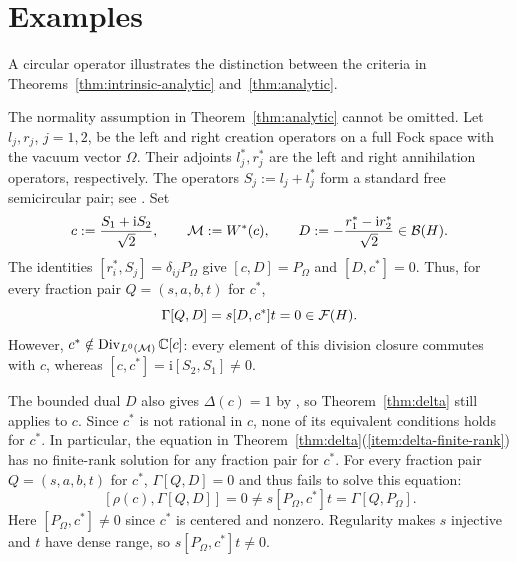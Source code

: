 \section{Examples}
\label{sec:examples}

A circular operator illustrates the distinction between the criteria in Theorems~\ref{thm:intrinsic-analytic} and~\ref{thm:analytic}.

\begin{remark}\label{rem:normality}
The normality assumption in Theorem~\ref{thm:analytic} cannot be omitted.
Let $l_j,r_j$, $j=1,2$, be the left and right creation operators on a full Fock space with the vacuum vector $\Omega$.
Their adjoints $l_j^*,r_j^*$ are the left and right annihilation operators, respectively.
The operators $S_j:=l_j+l_j^*$ form a standard free semicircular pair; see \cite[5.13]{Voi98}.
Set
\[
 c:=\frac{S_1+\mathrm iS_2}{\sqrt2},\qquad
 \mathcal M:=W^*(c),\qquad
 D:=-\frac{r_1^*-\mathrm i r_2^*}{\sqrt2}\in\mathcal B(H).
\]
The identities $[r_i^*,S_j]=\delta_{ij}P_\Omega$ give $[c,D]=P_\Omega$ and $[D,c^*]=0$.
Thus, for every fraction pair $Q=(s,a,b,t)$ for $c^*$,
\[
 \Gamma[Q,D]=s[D,c^*]t=0\in\mathcal F(H).
\]
However, $c^*\notin\operatorname{Div}_{L^0(\mathcal M)}\mathbb C[c]$: every element of this division closure commutes with $c$, whereas $[c,c^*]=\mathrm i[S_2,S_1]\ne0$.

The bounded dual $D$ also gives $\Delta(c)=1$ by \cite[Proposition~6.2]{MSY23}, so Theorem~\ref{thm:delta} still applies to $c$.
Since $c^*$ is not rational in $c$, none of its equivalent conditions holds for $c^*$.
In particular, the equation in Theorem~\ref{thm:delta}\textup{(\ref{item:delta-finite-rank})} has no finite-rank solution for any fraction pair for $c^*$.
For every fraction pair $Q=(s,a,b,t)$ for $c^*$, $\Gamma[Q,D]=0$ and thus fails to solve this equation:
\[
 [\rho(c),\Gamma[Q,D]]=0
 \ne s[P_\Omega,c^*]t=\Gamma[Q,P_\Omega].
\]
Here $[P_\Omega,c^*]\ne0$ since $c^*$ is centered and nonzero.
Regularity makes $s$ injective and $t$ have dense range, so $s[P_\Omega,c^*]t\ne0$.
\end{remark}
